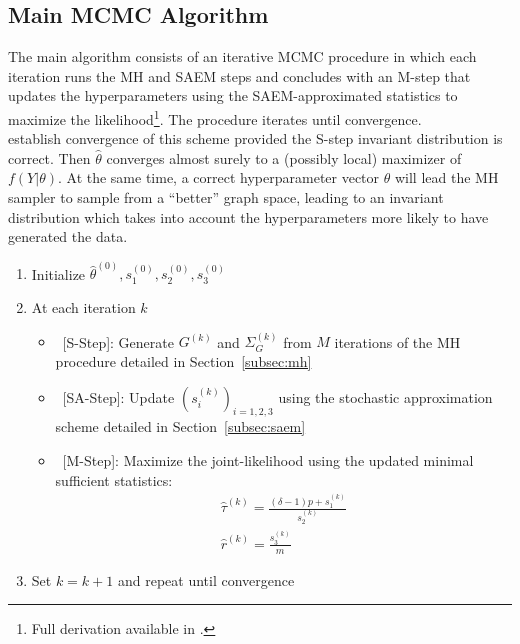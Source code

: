 \subsection{Main MCMC Algorithm}
The main algorithm consists of an iterative MCMC procedure in which each iteration runs the MH and SAEM steps and concludes with an M-step that updates the hyperparameters using the SAEM-approximated statistics to maximize the likelihood\footnote{Full derivation available in \textcite{donnet2012empirical}.}. The procedure iterates until convergence. \\
\textcite{kuhn2004coupling} establish convergence of this scheme provided the S-step invariant distribution is correct. Then $\hat \theta$ converges almost surely to a (possibly local) maximizer of $f(Y|\theta)$. At the same time, a correct hyperparameter vector $\theta$ will lead the MH sampler to sample from a ``better'' graph space, leading to an invariant distribution which takes into account the hyperparameters more likely to have generated the data. 

\begin{algorithm}[H]
    \caption{MCMC Algorithm}
    \begin{enumerate}
        \item Initialize $\hat\theta^{(0)}, s_1^{(0)}, s_2^{(0)},s_3^{(0)}$
        \item At each iteration $k$
        \begin{itemize}
            \item \ [S-Step]: Generate $G^{(k)}$ and $\Sigma_G^{(k)}$ from $M$ iterations of the MH procedure detailed in Section~\ref{subsec:mh}
            \item \ [SA-Step]: Update $(s_i^{(k)})_{i=1,2,3}$ using the stochastic approximation scheme detailed in Section~\ref{subsec:saem}
            \item \ [M-Step]: Maximize the joint-likelihood using the updated minimal sufficient statistics:
            \begin{equation*}
                \begin{gathered}
                    \hat\tau^{(k)} = \frac{(\delta-1)p + s_1^{(k)}}{s_2^{(k)}} \\
                    \hat r^{(k)} = \frac{s_3^{(k)}}{m}
                \end{gathered}
            \end{equation*}
        \end{itemize}
        \item Set $k = k+1$ and repeat until convergence
    \end{enumerate}
\end{algorithm}
